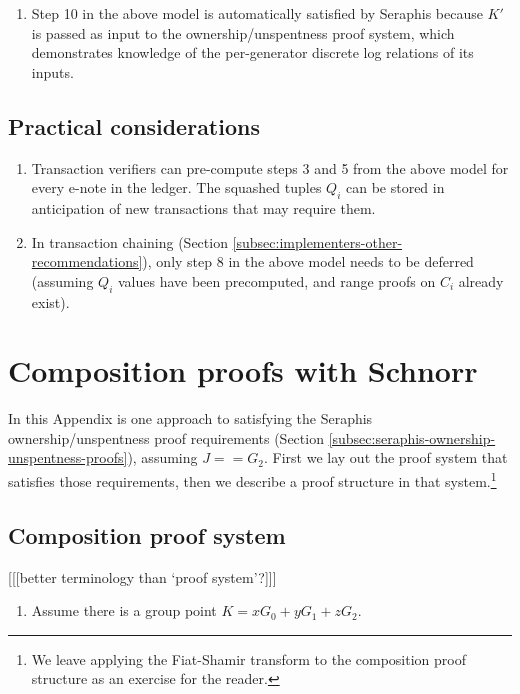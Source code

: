 \begin{appendices}
\begin{enumerate}
    \item Step 10 in the above model is automatically satisfied by Seraphis because $K'$ is passed as input to the ownership/unspentness proof system, which demonstrates knowledge of the per-generator discrete log relations of its inputs.
\end{enumerate}


\subsection{Practical considerations}
\label{appendix:squashed-e-note-model-practical-considerations}

\begin{enumerate}
    \item Transaction verifiers can pre-compute steps 3 and 5 from the above model for every e-note in the ledger. The squashed tuples $Q_i$ can be stored in anticipation of new transactions that may require them.

    \item In transaction chaining (Section \ref{subsec:implementers-other-recommendations}), only step 8 in the above model needs to be deferred (assuming $Q_i$ values have been precomputed, and range proofs on $C_i$ already exist).
\end{enumerate}



\section{Composition proofs with Schnorr}
\label{appendix:composition-with-schnorr}

In this Appendix is one approach to satisfying the Seraphis ownership/unspentness proof requirements (Section \ref{subsec:seraphis-ownership-unspentness-proofs}), assuming $J == G_2$. First we lay out the proof system that satisfies those requirements, then we describe a proof structure in that system.\footnote{We leave applying the Fiat-Shamir transform \cite{fiat-shamir-transform} to the composition proof structure as an exercise for the reader.}


\subsection{Composition proof system}
\label{appendix:composition-proof-system}

[[[better terminology than `proof system'?]]]

\begin{enumerate}
    \item Assume there is a group point $K = x G_0 + y G_1 + z G_2$.


\end{enumerate}
\end{appendices}
